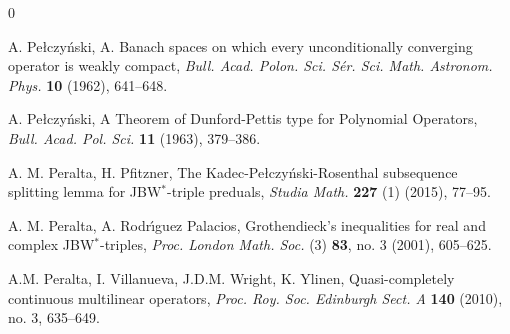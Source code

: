 \documentclass[10pt]{amsart}
\begin{document}
\begin{thebibliography}{0}
		
		 A. Pe\l{}czy{\'n}ski, A. Banach spaces on which every unconditionally converging operator is weakly compact, \emph{Bull. Acad. Polon. Sci. S\'{e}r. Sci. Math. Astronom. Phys.} \textbf{10} (1962), 641--648.
		
		 A. Pe\l{}czy{\'n}ski, A Theorem of Dunford-Pettis type for Polynomial Operators, \emph{Bull. Acad. Pol. Sci.} \textbf{11} (1963), 379--386.
		
		
		
		
		
		 A. M. Peralta, H. Pfitzner, The Kadec-Pe\l{}czy{\'n}ski-Rosenthal subsequence splitting lemma for JBW$^*$-triple preduals, \emph{Studia Math.} \textbf{227} (1) (2015), 77--95.	
		
		  A. M. Peralta, A. Rodr\'{\i}guez Palacios, Grothendieck's inequalities for real and complex JBW$^*$-triples, \emph{Proc. London Math. Soc.} (3) \textbf{83}, no. 3 (2001), 605--625.
		
		
		
		
		 A.M. Peralta, I. Villanueva, J.D.M. Wright, K. Ylinen, Quasi-completely continuous multilinear operators, \emph{Proc. Roy. Soc. Edinburgh Sect. A} \textbf{140} (2010), no. 3, 635--649.
		

\end{thebibliography}
\end{document}
